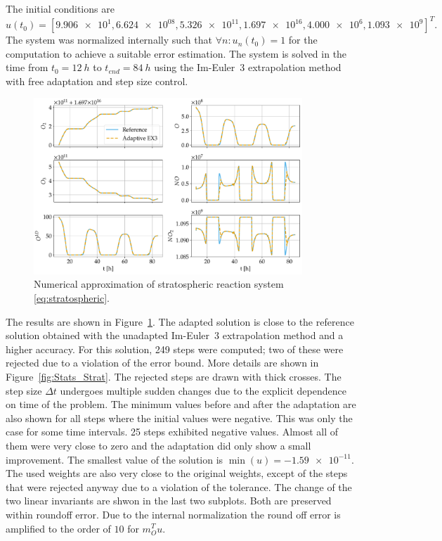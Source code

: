 \documentclass[a4paper]{article}
\numberwithin{equation}{section}
\theoremstyle{plain}
\theoremstyle{definition}
\numberwithin{theorem}{section}
\newcommand{\dt}{{\Delta t}}
\newcommand{\1}{\mathbbm{1}}
\begin{document}
The initial conditions are
\begin{equation}
  u(t_0) = [
    \num{9.906e+1},
    \num{6.624e08},
    \num{5.326e11},
    \num{1.697e16},
    \num{4.000e6},
    \num{1.093e9}
  ]^T.
\end{equation}
The system was normalized internally such that $\forall n\colon u_n(t_0) = 1$
for the computation to achieve a suitable error estimation.
The system is solved in the time from $t_{0} = \SI{12}{h}$ to $t_{end} = \SI{84}{h}$
using the Im-Euler~3 extrapolation method with free adaptation and step size
control.

\begin{figure}
\centering
\includegraphics[width=0.9\textwidth]{plots/Stratospheric_time.pdf}
\caption{Numerical approximation of stratospheric reaction system
         \eqref{eq:stratospheric}.}
\label{fig:Stratospheric_time}
\end{figure}

The results are shown in Figure~\ref{fig:Stratospheric_time}.
The adapted solution is close to the reference solution obtained
with the unadapted Im-Euler~3 extrapolation method and a higher accuracy.
For this solution, 249 steps were computed; two of these were rejected due to
a violation of the error bound.
More details are shown in Figure~\ref{fig:Stats_Strat}. The rejected steps are drawn with thick crosses.
The step size $\dt$ undergoes multiple sudden changes due to the explicit dependence
on time of the problem.
The minimum values before and after the adaptation are also shown for all steps where the initial values were negative.
This was only the case for some time intervals. 25 steps exhibited negative values.
Almost all of them were very close to zero and the adaptation did only show a small improvement.
The smallest value of the solution is $\min(u) = \num{-1.59e-11}$.
The used weights are also very close to the original weights, except of the steps that were rejected anyway due to a violation of the tolerance.
The change of the two linear invariants are shwon in the last two subplots. Both are preserved within roundoff error.
Due to the internal normalization the round off error is amplified to the order of $10$ for $m_O^Tu$.
\end{document}
